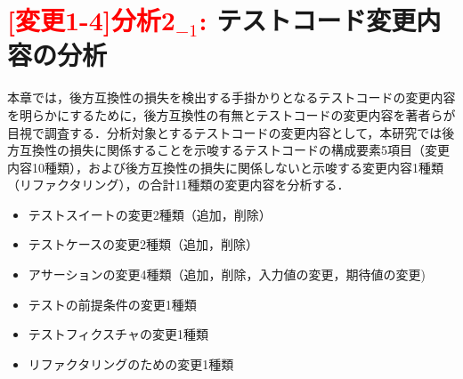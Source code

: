 \documentclass[submit]{ipsj}
\begin{document}


\section{\textcolor{red}{[変更1-4]分析2$_{-1}$: }テストコード変更内容の分析}\label{sec:contentAnalysis}

本章では，後方互換性の損失を検出する手掛かりとなるテストコードの変更内容を明らかにするために，後方互換性の有無とテストコードの変更内容を著者らが目視で調査する．分析対象とするテストコードの変更内容として，本研究では後方互換性の損失に関係することを示唆するテストコードの構成要素5項目（変更内容10種類），および後方互換性の損失に関係しないと示唆する変更内容1種類（リファクタリング），の合計11種類の変更内容を分析する．

\begin{itemize}
  \item テストスイートの変更2種類（追加，削除）
  \item テストケースの変更2種類（追加，削除）
  \item アサーションの変更4種類（追加，削除，入力値の変更，期待値の変更)
  \item テストの前提条件の変更1種類
  \item テストフィクスチャの変更1種類
  \item リファクタリングのための変更1種類  
\end{itemize}
\vspace{-4mm}
\end{document}

